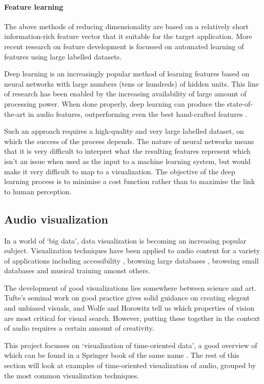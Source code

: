 \paragraph{Feature learning}
The above methods of reducing dimensionality are based on a relatively short
information-rich feature vector that it suitable for the target application.
More recent research on feature development is focussed on automated learning
of features using large labelled datasets.

Deep learning is an increasingly popular method of learning features based on
neural networks with large numbers (tens or hundreds) of hidden units. This
line of research has been enabled by the increasing availability of large
amount of processing power. When done properly, deep learning can produce the
state-of-the-art in audio features, outperforming even the best hand-crafted
features \cite{Hamel2010,Sigtia2014}.

Such an approach requires a high-quality and very large labelled dataset, on
which the success of the process depends. The nature of neural networks means
that it is very difficult to interpret what the resulting features represent
which isn't an issue when used as the input to a machine learning system, but
would make it very difficult to map to a visualization. The objective of the
deep learning process is to minimise a cost function rather than to maximise
the link to human perception.

\subsection{Audio visualization}
In a world of `big data', data visualization is becoming an increasing popular
subject. Visualization techniques have been applied to audio content for a
variety of applications including accessibility \cite{Ho-Ching2003}, browsing
large databases \cite{FontCorbera2010}, browsing small databases \cite{Yoo2011}
and musical training \cite{Ferguson2005} amonst others.

The development of good visualizations lies somewhere between science and art.
Tufte's seminal work on good practice \cite{Tufte2001} gives solid guidance on
creating elegent and unbiased visuals, and Wolfe and Horowitz \cite{Wolfe2004}
tell us which properties of vision are most critical for visual search.
However, putting these together in the context of audio requires a certain
amount of creativity.

This project focusses on `visualization of time-oriented data', a good overview
of which can be found in a Springer book of the same name \cite{Aigner2011}.
The rest of this section will look at examples of time-oriented visualization
of audio, grouped by the most common visualization techniques.

